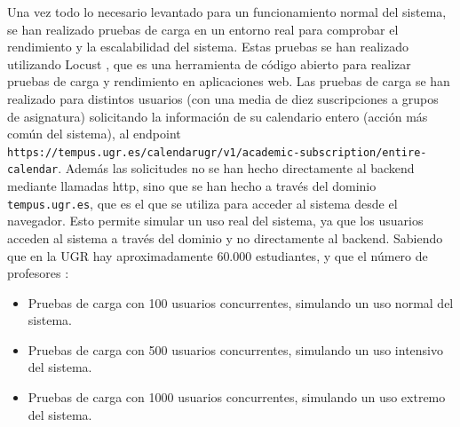 Una vez todo lo necesario levantado para un funcionamiento normal del sistema, se han realizado pruebas de carga en un entorno real para comprobar el rendimiento y la escalabilidad del sistema. Estas pruebas se han realizado utilizando Locust \cite{locust}, que es una herramienta de código abierto para realizar pruebas de carga y rendimiento en aplicaciones web.
\newline\newline
Las pruebas de carga se han realizado para distintos usuarios (con una media de diez suscripciones a grupos de asignatura) solicitando la información de su calendario entero (acción más común del sistema), al endpoint \texttt{https://tempus.ugr.es/calendarugr/v1/academic-subscription/entire-calendar}.\newline
Además las solicitudes no se han hecho directamente al backend mediante llamadas http, sino que se han hecho a través del dominio \texttt{tempus.ugr.es}, que es el que se utiliza para acceder al sistema desde el navegador. Esto permite simular un uso real del sistema, ya que los usuarios acceden al sistema a través del dominio y no directamente al backend.
\newline
Sabiendo que en la UGR hay aproximadamente 60.000 estudiantes, y que el número de profesores :
\begin{itemize}
    \item Pruebas de carga con 100 usuarios concurrentes, simulando un uso normal del sistema.
    \item Pruebas de carga con 500 usuarios concurrentes, simulando un uso intensivo del sistema.
    \item Pruebas de carga con 1000 usuarios concurrentes, simulando un uso extremo del sistema.
\end{itemize}

